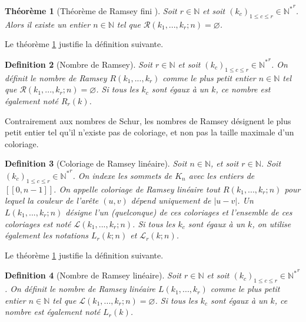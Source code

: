 \documentclass{article}
\newtheorem{definition}{Definition}[section]
\newtheorem{theorem}[definition]{Théorème}
\begin{document}
\begin{theorem}[Théorème de Ramsey fini \cite{Ramsey}]
\label{thm:ram}
Soit \(r \in \mathbb{N}\) et soit \((k_c)_{1 \leqslant c \leqslant r} \in {\mathbb{N}^*}^r\). Alors il existe un entier \(n \in \mathbb{N}\) tel que \(\mathcal{R}(k_1, ..., k_r ; n) = \varnothing\).
\end{theorem}

Le théorème \ref{thm:ram} justifie la définition suivante.

\begin{definition}[Nombre de Ramsey]
Soit \(r \in \mathbb{N}\) et soit \((k_c)_{1 \leqslant c \leqslant r} \in {\mathbb{N}^*}^r\). On définit le nombre de Ramsey \(R(k_1, ..., k_r)\) comme le plus petit entier \(n \in \mathbb{N}\) tel que \(\mathcal{R}(k_1, ..., k_r ; n) = \varnothing\). Si tous les \(k_c\) sont égaux à un \(k\), ce nombre est également noté \(R_r(k)\).
\end{definition}

Contrairement aux nombres de Schur, les nombres de Ramsey désignent le plus petit entier tel qu'il n'existe pas de coloriage, et non pas la taille maximale d'un coloriage.

\begin{definition}[Coloriage de Ramsey linéaire]
Soit \(n \in \mathbb{N}\), et soit \(r \in \mathbb{N}\). Soit \((k_c)_{1 \leqslant c \leqslant r} \in {\mathbb{N}^*}^r\). On indexe les sommets de \(K_n\) avec les entiers de \([\![0, n - 1]\!]\). On appelle coloriage de Ramsey linéaire tout \(R(k_1, ..., k_r ; n)\) pour lequel la couleur de l'arête \((u, v)\) dépend uniquement de \(|u - v|\). Un \(L(k_1, ..., k_r ; n)\) désigne l'un (quelconque) de ces coloriages et l'ensemble de ces coloriages est noté \(\mathcal{L}(k_1, ..., k_r ; n)\). Si tous les \(k_c\) sont égaux à un \(k\), on utilise également les notations \(L_r(k; n)\) et \(\mathcal{L}_r(k; n)\).
\end{definition}

Le théorème \ref{thm:ram} justifie la définition suivante.

\begin{definition}[Nombre de Ramsey linéaire]
Soit \(r \in \mathbb{N}\) et soit \((k_c)_{1 \leqslant c \leqslant r} \in {\mathbb{N}^*}^r\). On définit le nombre de Ramsey linéaire \(L(k_1, ..., k_r)\) comme le plus petit entier \(n \in \mathbb{N}\) tel que \(\mathcal{L}(k_1, ..., k_r ; n) = \varnothing\). Si tous les \(k_c\) sont égaux à un \(k\), ce nombre est également noté \(L_r(k)\).
\end{definition}
\end{document}
